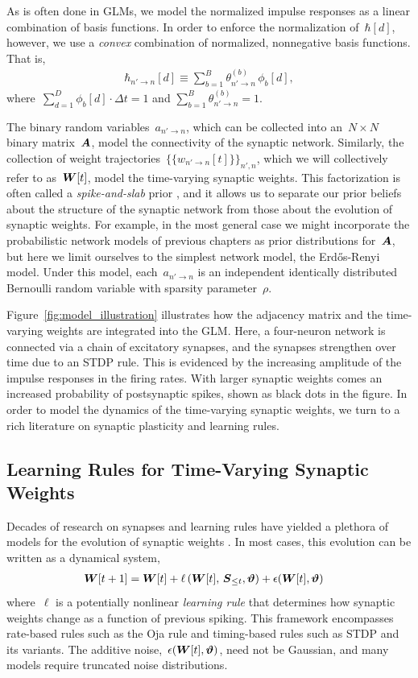 As is often done in GLMs, we model the normalized impulse responses as
a linear combination of basis functions. In order to enforce the
normalization of~$\hbar[d]$, however, we use a \emph{convex}
combination of normalized, nonnegative basis functions. That is,
\begin{align*}
\hbar_{n' \to n}[d] \equiv \sum_{b=1}^B \theta_{n' \to n}^{(b)}\, \phi_b[d],
\end{align*}
where~${\sum_{d=1}^D \phi_b[d] \cdot \Delta t = 1}$ and
${\sum_{b=1}^B \theta_{n' \to n}^{(b)} = 1}$. 

The binary random variables~$a_{n' \to n}$, which can be collected
into an~${N\times N}$ binary matrix~$\boldsymbol{A}$, model the connectivity of
the synaptic network. Similarly, the collection of weight
trajectories~${\{\{w_{n' \to n}[t]\}\}_{n',n}}$, which we will
collectively refer to as~$\boldsymbol{W}[t]$, model the time-varying synaptic
weights. This factorization is often called a \emph{spike-and-slab}
prior \cite{Mitchell1988}, and it allows us to separate our prior
beliefs about the structure of the synaptic network from those about
the evolution of synaptic weights. For example, in the most general
case we might incorporate the probabilistic network models of previous chapters
 as prior distributions for~$\boldsymbol{A}$, but here we limit
ourselves to the simplest network model, the Erd\H{o}s-Renyi
model. Under this model, each~$a_{n' \to n}$ is an independent
identically distributed Bernoulli random variable with sparsity
parameter~$\rho$.

Figure~\ref{fig:model_illustration} illustrates how the adjacency
matrix and the time-varying weights are integrated into the GLM. Here,
a four-neuron network is connected via a chain of excitatory synapses,
and the synapses strengthen over time due to an STDP rule. This is
evidenced by the increasing amplitude of the impulse responses in the
firing rates.  With larger synaptic weights comes an increased
probability of postsynaptic spikes, shown as black dots in the
figure. In order to model the dynamics of the time-varying synaptic
weights, we turn to a rich literature on synaptic plasticity and
learning rules.

\subsection{Learning Rules for Time-Varying Synaptic Weights}
Decades of research on synapses and learning rules have yielded a
plethora of models for the evolution of synaptic weights
\cite{Caporale-2008}. In most cases, this evolution can be written as
a dynamical system,
\begin{align*} 
\boldsymbol{W}[t+1] &= \boldsymbol{W}[t] + \ell\left(\boldsymbol{W}[t], \, \boldsymbol{S}_{\leq t}, \boldsymbol{\vartheta} \right) + \epsilon(\boldsymbol{W}[t], \boldsymbol{\vartheta})
\end{align*}
where~$\ell$ is a potentially nonlinear \emph{learning rule} that
determines how synaptic weights change as a function of previous
spiking. This framework encompasses rate-based rules such as the Oja
rule \cite{Oja-1982} and timing-based rules such as STDP and its
variants. The additive noise,~${\epsilon(\boldsymbol{W}[t], \boldsymbol{\vartheta})}$, need not be
Gaussian, and many models require truncated noise distributions.

